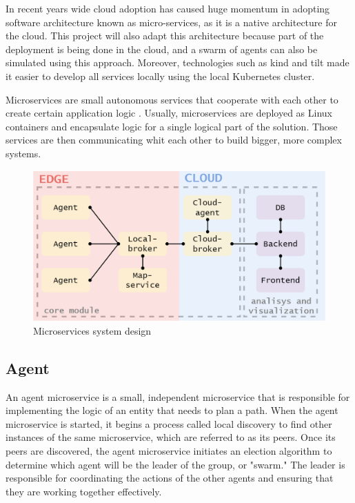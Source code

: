 In recent years wide cloud adoption has caused huge momentum in adopting software architecture known as micro-services, as it is a native architecture for the cloud. This project will also adapt this architecture because part of the deployment is being done in the cloud, and a swarm of agents can also be simulated using this approach. Moreover, technologies such as kind and tilt made it easier to develop all services locally using the local Kubernetes cluster.

Microservices are small autonomous services that cooperate with each other to create certain application logic \cite{building_microservices}. Usually, microservices are deployed as Linux containers and encapsulate logic for a single logical part of the solution. Those services are then communicating whit each other to build bigger, more complex systems.

\begin{figure}[H]
    \centering
    \includegraphics[width=\textwidth]{pictures/services.png}
    \caption{Microservices system design}
    \label{fig:micro_services}
\end{figure}

\subsection{Agent}
An agent microservice is a small, independent microservice that is responsible for implementing the logic of an entity that needs to plan a path. When the agent microservice is started, it begins a process called local discovery to find other instances of the same microservice, which are referred to as its peers. Once its peers are discovered, the agent microservice initiates an election algorithm to determine which agent will be the leader of the group, or "swarm." The leader is responsible for coordinating the actions of the other agents and ensuring that they are working together effectively.

